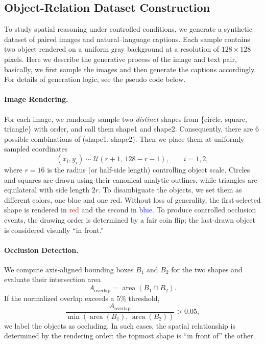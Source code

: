 \subsection{Object-Relation Dataset Construction}\label{method:dataset}

To study spatial reasoning under controlled conditions, we generate a synthetic dataset of paired images and natural–language captions. Each sample contains two object rendered on a uniform gray background at a resolution of $128\times 128$ pixels. Here we describe the generative process of the image and text pair, basically, we first sample the images and then generate the captions accordingly. For details of generation logic, see the pseudo code below. 

\paragraph{Image Rendering.}
For each image, we randomly sample two \textit{distinct} shapes from \{circle, square, triangle\} with order, and call them shape1 and shape2. Consequently, there are 6 possible combinations of (shape1, shape2). 
Then we place them at uniformly sampled coordinates
\[
(x_i, y_i) \sim \mathcal{U}(r+1,\, 128-r-1), \qquad i=1,2,
\]
where $r=16$ is the radius (or half-side length) controlling object scale. Circles and squares are drawn using their canonical analytic outlines, while triangles are equilateral with side length $2r$. 
To disambiguate the objects, we set them as different colors, one blue and one red. Without loss of generality, the first-selected shape is rendered in \textcolor{red}{red} and the second in \textcolor{blue}{blue}. 
To produce controlled occlusion events, the drawing order is determined by a fair coin flip; the last-drawn object is considered visually ``in front.''

\paragraph{Occlusion Detection.}
We compute axis-aligned bounding boxes $B_1$ and $B_2$ for the two shapes and evaluate their intersection area
\[
A_{\text{overlap}} = \operatorname{area}(B_1 \cap B_2).
\]
If the normalized overlap exceeds a $5\%$ threshold,
\[
\frac{A_{\text{overlap}}}{\min(\operatorname{area}(B_1),\,\operatorname{area}(B_2))} > 0.05,
\]
we label the objects as occluding. In such cases, the spatial relationship is determined by the rendering order: the topmost shape is ``in front of'' the other.


